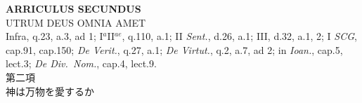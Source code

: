 \documentclass[paper=a4paper,fontsize=10pt,jafontsize=9pt,titlepage]{jlreq}
\begin{document}
{}
\setcounter{section}{2}
\setcounter{subsection}{0}
\begin{center}
 {\Large {\bfseries ARRICULUS SECUNDUS}}\\
 {\large UTRUM DEUS OMNIA AMET}\\
 {\footnotesize Infra, q.23, a.3, ad 1; I$^a$II$^{ae}$, q.110, a.1; II
 {\itshape Sent.}, d.26, a.1; III, d.32, a.1, 2; I {\itshape SCG},
 cap.91, cap.150; {\itshape De Verit.}, q.27, a.1; {\itshape De
 Virtut.}, q.2, a.7, ad 2; in {\itshape Ioan.}, cap.5, lect.3; {\itshape
 De Div.~Nom.}, cap.4, lect.9.}\\
 {\Large 第二項\\神は万物を愛するか}
\end{center}
\end{document}
